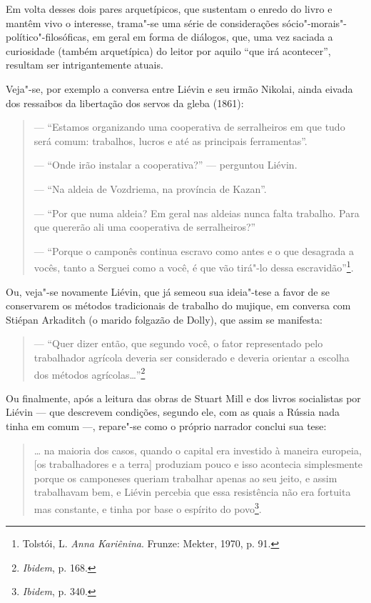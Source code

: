 Em volta desses dois pares arquetípicos, que sustentam o enredo do
livro e mantêm vivo o interesse, trama"-se uma série de considerações
sócio"-morais"-político"-filosóficas, em geral em forma de diálogos, que,
uma vez saciada a curiosidade (também arquetípica) do leitor por aquilo
``que irá acontecer'', resultam ser intrigantemente atuais.

Veja"-se, por exemplo a conversa entre Liévin e seu irmão Nikolai, ainda
eivada dos ressaibos da libertação dos servos da gleba (1861):

\begin{quote}
--- ``Estamos organizando uma cooperativa de serralheiros em que tudo será
comum: trabalhos, lucros e até as principais ferramentas''.

\noindent --- ``Onde irão instalar a cooperativa?'' --- perguntou Liévin.

\noindent --- ``Na aldeia de Vozdriema, na província de Kazan''.

\noindent --- ``Por que numa aldeia? Em geral nas aldeias nunca falta trabalho. Para
que quererão ali uma cooperativa de serralheiros?''

\noindent --- ``Porque o camponês continua escravo como antes e o que desagrada a
vocês, tanto a Serguei como a você, é que vão tirá"-lo dessa escravidão''\footnote{Tolstói, L. \emph{Anna Kariênina}. Frunze: Mekter, 1970, p. 91.}.
\end{quote}

Ou, veja"-se novamente Liévin, que já semeou sua ideia"-tese a
favor de se conservarem os métodos tradicionais de trabalho do
mujique, em conversa com Stiépan Arkaditch (o marido folgazão de
Dolly), que assim se manifesta:

\begin{quote}
--- ``Quer dizer então, que segundo você, o fator representado pelo
trabalhador agrícola deveria ser considerado e deveria orientar a
escolha dos métodos agrícolas\ldots{}''\footnote{\emph{Ibidem}, p. 168.}
\end{quote}

Ou finalmente, após a leitura das obras de Stuart Mill e dos livros
socialistas por Liévin --- que descrevem condições, segundo ele, com as
quais a Rússia nada tinha em comum ---, repare"-se como o próprio
narrador conclui sua tese:

\begin{quote}
\ldots{} na maioria dos casos, quando o capital era investido à maneira
europeia, [os trabalhadores e a terra] produziam pouco e isso
acontecia simplesmente porque os camponeses queriam trabalhar apenas ao
seu jeito, e assim trabalhavam bem, e Liévin percebia que essa
resistência não era fortuita mas constante, e tinha por base o espírito
do povo\footnote{\emph{Ibidem}, p. 340.}.
\end{quote}

